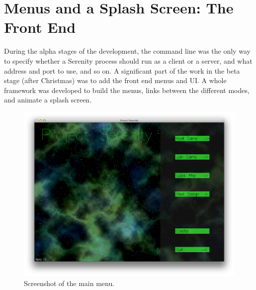 \section{Menus and a Splash Screen: The Front End}


During the alpha stages of the development, the command line was the only way to specify whether a Serenity process should run as a client or a server, and what address and port to use, and so on. A significant part of the work in the beta stage (after Christmas) was to add the front end menus and UI. A whole framework was developed to build the menus, links between the different modes, and animate a splash screen. 

\begin{figure}
	\hspace{-2.5em}\includegraphics[width=17cm]{res/serenityscreens/01-mainmenu}
	\caption[Screenshot of the main menu]{Screenshot of the main menu.}
	\label{fig:mainmenu}
\end{figure}

